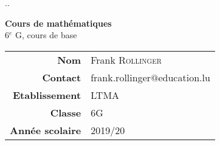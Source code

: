 \documentclass[a4paper, 11pt, oneside, BCOR=0mm, DIV=15]{scrbook} %
\def\classe{6G}
\def\season{2019/20}
\begin{document}
\thispagestyle{empty}
{\color{white}.\hfill.}
\vspace{5cm}

\begin{center}
\huge
{\bfseries Cours de mathématiques} \\
6$^e$ G, cours de base
\end{center}

\vfill

\large
\begin{center}
\begin{tabular}{r|l}
\textbf{Nom}
 & Frank {\scshape Rollinger} \\
\textbf{Contact}
 & {frank.rollinger$@$education.lu} \\
\textbf{Etablissement}
 & {\scshape LTMA} \\
\textbf{Classe}
 & {\scshape \classe} \\
\textbf{Année scolaire}
 & {\scshape \season}
\end{tabular}
\end{center}


\clearpage




%
%
%
%
%
\end{document}
